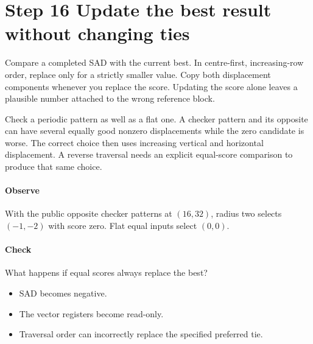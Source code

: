 \section{Step 16 Update the best result without changing ties}\label{h263-motion-s06}
Compare a completed SAD with the current best. In centre-first, increasing-row
order, replace only for a strictly smaller value. Copy both displacement
components whenever you replace the score. Updating the score alone leaves a
plausible number attached to the wrong reference block.

Check a periodic pattern as well as a flat one. A checker pattern and its
opposite can have several equally good nonzero displacements while the zero
candidate is worse. The correct choice then uses increasing vertical and
horizontal displacement. A reverse traversal needs an explicit equal-score
comparison to produce that same choice.

\paragraph{Observe} With the public opposite checker patterns at $(16,32)$,
radius two selects $(-1,-2)$ with score zero. Flat equal inputs select $(0,0)$.
\paragraph{Check} What happens if equal scores always replace the best?
\begin{itemize}
  \item[A.] SAD becomes negative.
  \item[B.] The vector registers become read-only.
  \item[C.] Traversal order can incorrectly replace the specified preferred tie.
\end{itemize}
